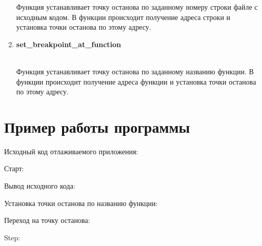 \documentclass[a4paper,14pt,oneside]{extreport}  %
\begin{document}
\begin{enumerate}
	Функция устанавливает точку останова по заданному номеру строки файле с исходным кодом. В функции происходит получение адреса строки и установка точки останова по этому адресу. 
	\item 
   {\bf set\_breakpoint\_at\_function}
   \begin{figure}[h!]
      \center{\texttt{[image: 7]}}
      \caption{}
    \end{figure}
     \\

Функция устанавливает точку останова по заданному названию функции. В функции происходит получение адреса функции и установка точки останова по этому адресу.
	\end{enumerate}

\chapter{Пример работы программы}
\noindent Исходный код отлаживаемого приложения: 
\begin{figure}[h!]
	\caption{}
\end{figure}

\noindent Старт:
\begin{figure}[h!]
	\caption{}
\end{figure}

\newpage 

\noindent Вывод исходного кода:
\begin{figure}[h!]
	\caption{}
\end{figure}

\noindent Установка точки останова по названию функции:
\begin{figure}[h!]
	\caption{}
\end{figure}

\newpage 

\noindent Переход на точку останова: 
\begin{figure}[h!]
	\caption{}
\end{figure}

\noindent Step: 
\begin{figure}[h!]
	\caption{}
\end{figure}
\end{document}
